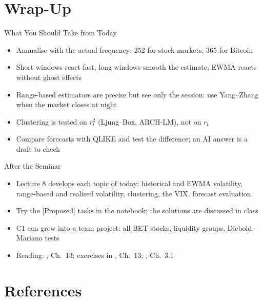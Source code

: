 \section{Wrap-Up}

\begin{frame}{What You Should Take from Today}
\itemsize{\small}
\begin{itemize}
    \item Annualise with the actual frequency: 252 for stock markets, 365 for Bitcoin
    \item Short windows react fast, long windows smooth the estimate; EWMA reacts without ghost effects
    \item Range-based estimators are precise but see only the session: use Yang--Zhang when the market closes at night
    \item Clustering is tested on $r_t^2$ (Ljung--Box, ARCH-LM), not on $r_t$
    \item Compare forecasts with QLIKE and test the difference; an AI answer is a draft to check
\end{itemize}
\end{frame}

\begin{frame}{After the Seminar}
\itemsize{\small}
\begin{itemize}
    \item Lecture 8 develops each topic of today: historical and EWMA volatility, range-based and realised volatility, clustering, the VIX, forecast evaluation
    \item Try the [Proposed] tasks in the notebook; the solutions are discussed in class
    \item C1 can grow into a team project: all BET stocks, liquidity groups, Diebold--Mariano tests
    \item Reading: , Ch.~13; exercises in , Ch.~13; , Ch.~3.1
\end{itemize}
\end{frame}


\section{References}


